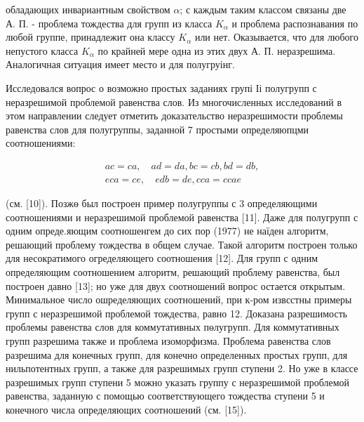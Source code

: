 \documentclass[10pt]{article}
\begin{document}
обладающих инвариантным свойством $\alpha$; с каждым таким классом связаны две А. П. - проблема тождества для групп из класса $K_{\alpha}$ и проблема распознавания по любой группе, принадлежит она классу $K_{\alpha}$ или нет. Оказывается, что для любого непустого класса $K_{\alpha}$ по крайней мере одна из этих двух А. П. неразрешима. Аналогичная ситуация имеет место и для полугруінг.



Исследовался вопрос о возможно простых заданиях групі Іі полугрупп с неразрешимой проблемой равенства слов. Из многочисленных исследований в этом направлении следует отметить доказательство неразрешимости проблемы равенства слов для полугруппы, заданной 7 простыми определяюпцми соотношениями:



\[

\begin{gathered}

a c=c a, \quad a d=d a, b c=c b, b d=d b, \\

e c a=c e, \quad e d b=d e, c c a=c c a e

\end{gathered}

\]



(см. [10]). Позжө был построен пример полугруппы с 3 определяющими соотношениями и неразрешимой проблемой равенства [11]. Даже для полугрупп с одним опреде.яющим соотношенгем до сих пор (1977) не наїден алгоритм, решающий проблему тождества в общем случае. Такой алгоритм построен только для несократимого огределяющего соотношения [12]. Для групп с одним определяющим соотношением алгоритм, решающий проблему равенства, был построен давно [13]; но уже для двух соотношений вопрос остается открытым. Минимальное число ошределяющих соотношений, при к-ром извсстны примеры групп с неразрешимой проблемой тождества, равно 12. Доказана разрешимость проблемы равенства слов для коммутативных пөлугрупп. Для коммутативных групп разрешима также и проблема изоморфизма. Проблема равенства слов разрешима для конечных групп, для конечно определенных простых групп, для нильпотентных групп, а также для разрешимых групп ступени 2. Но уже в классе разрешимых групп ступени 5 можно указать группу с неразрешимой проблемой равенства, заданную с помощью соответствующего тождества ступени 5 и конечного числа определяющих соотношений (см. [15]).
\end{document}
